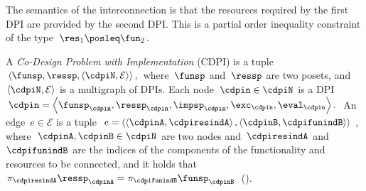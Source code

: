 
\noindent The semantics of the interconnection is that the resources
required by the first DPI are provided by the second DPI. This is
a partial order inequality constraint of the type~$\res_{1}\posleq\fun_{2}$.

\begin{defn}
\label{def:cdpi}A \emph{Co-Design Problem with Implementation} (CDPI)
is a tuple $\left\langle \funsp,\ressp,\left\langle \cdpiN,\mathcal{E}\right\rangle \right\rangle ,$
where~$\funsp$ and~$\ressp$ are two posets, and~$\left\langle \cdpiN,\mathcal{E}\right\rangle $
is a\emph{ }multigraph of DPIs. Each node~$\cdpin\in\cdpiN$ is a
DPI $\cdpin=\left\langle \funsp_{\cdpin},\ressp_{\cdpin},\impsp_{\cdpin},\exc_{\cdpin},\eval_{\cdpin}\right\rangle .$
An edge~$e\in\mathcal{E}$ is a tuple $e=\left\langle \left\langle \cdpinA,\cdpiresindA\right\rangle ,\left\langle \cdpinB,\cdpifunindB\right\rangle \right\rangle $,
where~$\cdpinA,\cdpinB\in\cdpiN$ are two nodes and~$\cdpiresindA$
and~$\cdpifunindB$ are the indices of the components of the functionality
and resources to be connected, and it holds that~$\pi_{\cdpiresindA}\ressp_{\cdpinA}=\pi_{\cdpifunindB}\funsp_{\cdpinB}$~(). 

\end{defn}

